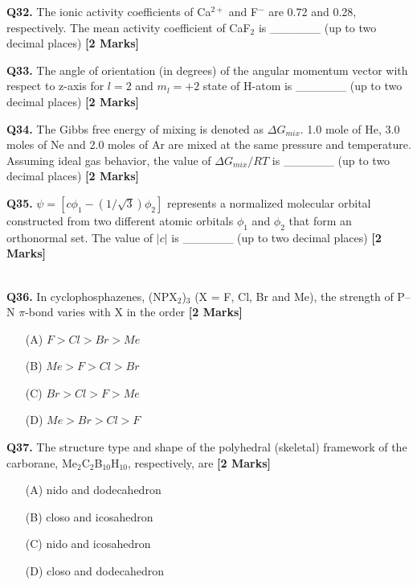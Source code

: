 \documentclass[11pt]{article}
\newcommand{\questionb}[2]{
    \noindent\textbf{Q#2.} #1 \hfill \textbf{[2 Marks]}
}
\begin{document}
\questionb{The ionic activity coefficients of Ca\(^{2+}\) and F\(^{-}\) are 0.72 and 0.28, respectively. The mean activity coefficient of CaF\(_2\) is \_\_\_\_\_\_ (up to two decimal places)}{32}
\vspace{0.5cm}

\questionb{The angle of orientation (in degrees) of the angular momentum vector with respect to z-axis for \( l = 2 \) and \( m_l = +2 \) state of H-atom is \_\_\_\_\_\_ (up to two decimal places)}{33}
\vspace{0.5cm}

\questionb{The Gibbs free energy of mixing is denoted as \( \Delta G_{mix} \). 1.0 mole of He, 3.0 moles of Ne and 2.0 moles of Ar are mixed at the same pressure and temperature. Assuming ideal gas behavior, the value of \( \Delta G_{mix}/RT \) is \_\_\_\_\_\_ (up to two decimal places)}{34}
\vspace{0.5cm}

\questionb{\( \psi = [c\phi_1 - (1/\sqrt{3})\phi_2] \) represents a normalized molecular orbital constructed from two different atomic orbitals \( \phi_1 \) and \( \phi_2 \) that form an orthonormal set. The value of \( |c| \) is \_\_\_\_\_\_ (up to two decimal places)}{35}\\ \\
\vspace{0.5 cm}
\vspace{0.5cm}
\questionb{In cyclophosphazenes, (NPX\(_2\))\(_3\) (X = F, Cl, Br and Me), the strength of P–N \(\pi\)-bond varies with X in the order}{36}
\begin{enumerate}
    \item[(A)] $F > Cl > Br > Me$
    \item[(B)] $Me > F > Cl > Br$
    \item[(C)] $Br > Cl > F > Me$
    \item[(D)] $Me > Br > Cl > F$
\end{enumerate}
\vspace{0.5cm}

\questionb{The structure type and shape of the polyhedral (skeletal) framework of the carborane, Me\(_2\)C\(_2\)B\(_{10}\)H\(_{10}\), respectively, are}{37}
\begin{enumerate}
    \item[(A)] nido and dodecahedron
    \item[(B)] closo and icosahedron
    \item[(C)] nido and icosahedron
    \item[(D)] closo and dodecahedron
\end{enumerate}
\vspace{0.5cm}
\end{document}
